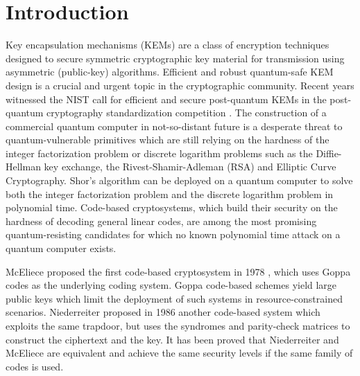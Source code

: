 \documentclass[runningheads]{llncs}
\begin{document}
\section*{Introduction}
Key encapsulation mechanisms (KEMs) are a class of encryption techniques designed to secure symmetric cryptographic key material for transmission using asymmetric (public-key) algorithms. Efficient and robust quantum-safe KEM design is a crucial and urgent topic in the cryptographic community. Recent years witnessed the NIST call for efficient and secure post-quantum KEMs in the post-quantum cryptography standardization competition \cite{chen2016report}.
The construction of a commercial quantum computer in not-so-distant future is a desperate threat to quantum-vulnerable primitives which are still relying on the hardness of the integer factorization problem or discrete logarithm problems such as the Diffie-Hellman key exchange, the Rivest-Shamir-Adleman (RSA) and Elliptic Curve Cryptography. Shor's algorithm \cite{shor1997polynomial} can be deployed on a quantum computer to solve both the integer factorization problem and the discrete logarithm problem in polynomial time. Code-based cryptosystems, which build their security on the hardness of decoding general linear codes, are among the most promising quantum-resisting candidates for which no known polynomial time attack on a quantum computer exists.

McEliece proposed the first code-based cryptosystem in 1978 \cite{mceliece1978public}, which uses  Goppa codes \cite{goppa1970new} as the underlying coding system. Goppa code-based schemes yield large public keys which limit the deployment of such systems in resource-constrained scenarios. Niederreiter proposed in 1986 another code-based system \cite{niederreiter1986knapsack} which exploits the same trapdoor, but uses the syndromes and parity-check matrices to construct the ciphertext and the key. It has been proved that Niederreiter and McEliece are equivalent \cite{li1994equivalence} and achieve the same security levels if the same family of codes is used.
\end{document}

